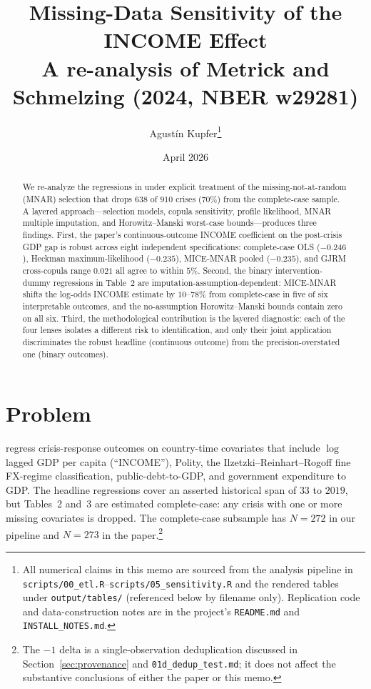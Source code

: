 \documentclass[11pt]{article}
\title{Missing-Data Sensitivity of the INCOME Effect\\
       {\large A re-analysis of Metrick and Schmelzing (2024, NBER w29281)}}
\author{Agust\'in Kupfer\thanks{All numerical claims in this memo are
  sourced from the analysis pipeline in
  \texttt{scripts/00\_etl.R}--\texttt{scripts/05\_sensitivity.R} and the
  rendered tables under \texttt{output/tables/} (referenced below by
  filename only). Replication code and data-construction notes are in
  the project's \texttt{README.md} and \texttt{INSTALL\_NOTES.md}.}}
\date{April 2026}
\begin{document}
\maketitle

\begin{abstract}
\noindent We re-analyze the regressions in \citet{metrick2024}
under explicit treatment of the missing-not-at-random (MNAR) selection
that drops $638$ of $910$ crises ($70\%$) from the complete-case sample.
A layered approach---selection models, copula sensitivity, profile
likelihood, MNAR multiple imputation, and Horowitz--Manski worst-case
bounds---produces three findings. First, the paper's continuous-outcome
INCOME coefficient on the post-crisis GDP gap is robust across eight
independent specifications: complete-case OLS ($-0.246$), Heckman
maximum-likelihood ($-0.235$), MICE-MNAR pooled ($-0.235$), and
GJRM cross-copula range $0.021$ all agree to within $5\%$. Second,
the binary intervention-dummy regressions in Table~2 are
imputation-assumption-dependent: MICE-MNAR shifts the log-odds INCOME
estimate by $10$--$78\%$ from complete-case in five of six interpretable
outcomes, and the no-assumption Horowitz--Manski bounds contain zero on
all six. Third, the methodological contribution is the layered
diagnostic: each of the four lenses isolates a different risk to
identification, and only their joint application discriminates the
robust headline (continuous outcome) from the precision-overstated one
(binary outcomes).
\end{abstract}

\section{Problem}

\citet{metrick2024} regress crisis-response outcomes on
country-time covariates that include $\log$ lagged GDP per capita
(``INCOME''), Polity, the Ilzetzki--Reinhart--Rogoff fine FX-regime
classification, public-debt-to-GDP, and government expenditure to GDP.
The headline regressions cover an asserted historical span of $33$
to $2019$, but Tables~2 and~3 are estimated complete-case: any crisis
with one or more missing covariates is dropped. The complete-case
subsample has $N = 272$ in our pipeline and $N = 273$ in the
paper.\footnote{The $-1$ delta is a single-observation deduplication
discussed in Section~\ref{sec:provenance} and
\texttt{01d\_dedup\_test.md}; it does not affect the
substantive conclusions of either the paper or this memo.}
\end{document}
